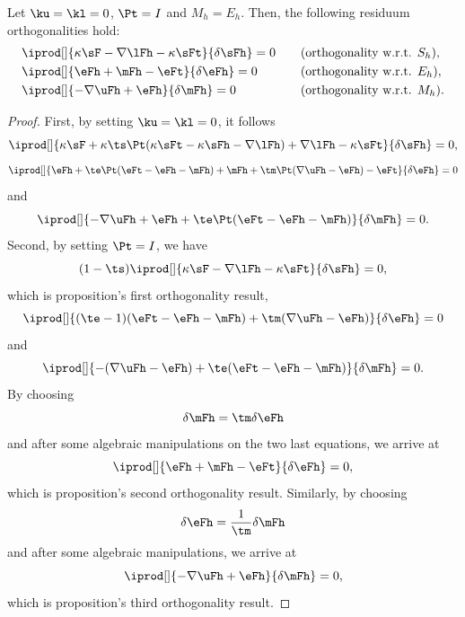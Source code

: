 \begin{proposition}
Let $\ku = \kl = 0$, $\Pt = I$ and $M_h = E_h$. Then, the following residuum orthogonalities hold:
\begin{alignat*}{3}
& \iprod[]{\kappa\sF-\nabla\lFh-\kappa\sFt}{\delta\sFh} = 0\quad && (\text{orthogonality w.r.t. } S_h),\\
& \iprod[]{\eFh+\mFh-\eFt                 }{\delta\eFh} = 0\quad && (\text{orthogonality w.r.t. } E_h),\\
& \iprod[]{-\nabla\uFh+\eFh               }{\delta\mFh} = 0\quad && (\text{orthogonality w.r.t. } M_h).
\end{alignat*}

\end{proposition}

\begin{proof}
First, by setting $\ku = \kl = 0$, it follows
$$\iprod[]{\kappa\sF+\kappa\ts\Pt(\kappa\sFt-\kappa\sFh-\nabla\lFh)+ \nabla\lFh-\kappa\sFt}{\delta\sFh} = 0,$$
%
$$\iprod[]{\eFh+\te\Pt(\eFt-\eFh-\mFh)+\mFh+\tm\Pt(\nabla\uFh-\eFh)-\eFt}{\delta\eFh} = 0$$
and
$$\iprod[]{-\nabla\uFh+\eFh+\te\Pt(\eFt-\eFh-\mFh)}{\delta\mFh} = 0.$$
%
Second, by setting $\Pt = I$, we have
$$(1-\ts)\iprod[]{\kappa\sF-\nabla\lFh-\kappa\sFt}{\delta\sFh} = 0,$$
which is proposition's first orthogonality result,%
$$\iprod[]{(\te-1)(\eFt-\eFh-\mFh)+\tm(\nabla\uFh-\eFh)}{\delta\eFh} = 0$$
%
and
%
$$\iprod[]{-(\nabla\uFh-\eFh)+\te(\eFt-\eFh-\mFh)}{\delta\mFh} = 0.$$
By choosing
$$\delta\mFh = \tm\delta\eFh$$
and after some algebraic manipulations on the two last equations, we arrive at
%
$$\iprod[]{\eFh+\mFh-\eFt}{\delta\eFh} = 0,$$
which is proposition's second orthogonality result.
Similarly, by choosing
$$\delta\eFh = \frac{1}{\tm}\delta\mFh$$
and after some algebraic manipulations, we arrive at
$$\iprod[]{-\nabla\uFh+\eFh}{\delta\mFh} = 0,$$
which is proposition's third orthogonality result.%
\end{proof}

